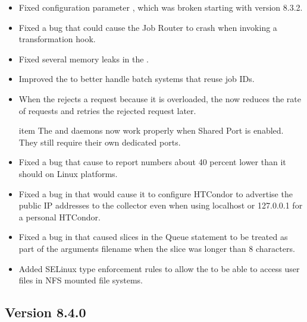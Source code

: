 \begin{itemize}
\item Fixed configuration parameter , which was
broken starting with version 8.3.2.

\item Fixed a bug that could cause the Job Router to crash when
invoking a transformation hook.

\item Fixed several memory leaks in the .

\item Improved the  to better handle batch systems
that reuse job IDs.

\item When the  rejects a request because it is
overloaded, the  now reduces the rate of requests
and retries the rejected request later.

item The  and  daemons now work properly
when Shared Port is enabled. They still require their own dedicated ports.

\item Fixed a bug that cause  to report numbers about 40 percent lower than it should
on Linux platforms.

\item Fixed a bug in  that would cause it to configure HTCondor to advertise the public
IP addresses to the collector even when using localhost or 127.0.0.1 for a personal HTCondor.

\item Fixed a bug in  that caused slices in the Queue statement to be treated as part of the
arguments filename when the slice was longer than 8 characters.

\item Added SELinux type enforcement rules to allow the  to be
able to access user files in NFS mounted file systems.
\end{itemize}

\subsection*{\label{sec:New-8-4-0}Version 8.4.0}

